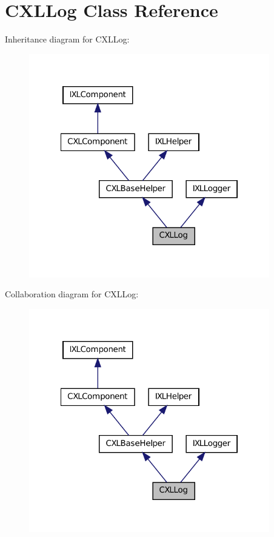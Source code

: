 \hypertarget{classCXLLog}{
\section{CXLLog Class Reference}
\label{classCXLLog}
}


Inheritance diagram for CXLLog:\nopagebreak
\begin{figure}[H]
\begin{center}
\leavevmode
\includegraphics[width=297pt]{classCXLLog__inherit__graph}
\end{center}
\end{figure}


Collaboration diagram for CXLLog:\nopagebreak
\begin{figure}[H]
\begin{center}
\leavevmode
\includegraphics[width=297pt]{classCXLLog__coll__graph}
\end{center}
\end{figure}

